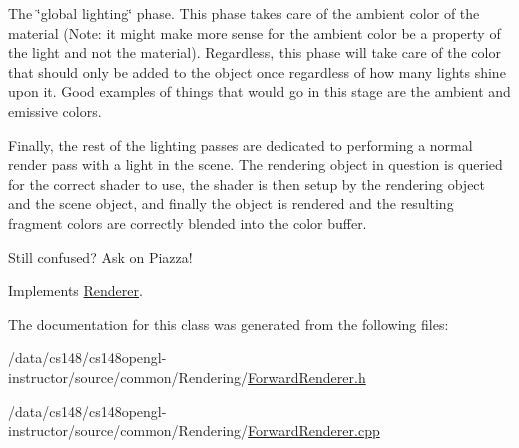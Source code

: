 \begin{DoxyEnumerate}
\item The \char`\"{}global lighting\char`\"{} phase. This phase takes care of the ambient color of the material (Note\+: it might make more sense for the ambient color be a property of the light and not the material). Regardless, this phase will take care of the color that should only be added to the object once regardless of how many lights shine upon it. Good examples of things that would go in this stage are the ambient and emissive colors.
\item Finally, the rest of the lighting passes are dedicated to performing a normal render pass with a light in the scene. The rendering object in question is queried for the correct shader to use, the shader is then setup by the rendering object and the scene object, and finally the object is rendered and the resulting fragment colors are correctly blended into the color buffer.
\end{DoxyEnumerate}

Still confused? Ask on Piazza! 

Implements \hyperlink{class_renderer_a38623da22aa718cfa41e2514ebd269f5}{Renderer}.



The documentation for this class was generated from the following files\+:\begin{DoxyCompactItemize}
\item 
/data/cs148/cs148opengl-\/instructor/source/common/\+Rendering/\hyperlink{_forward_renderer_8h}{Forward\+Renderer.\+h}\item 
/data/cs148/cs148opengl-\/instructor/source/common/\+Rendering/\hyperlink{_forward_renderer_8cpp}{Forward\+Renderer.\+cpp}\end{DoxyCompactItemize}
